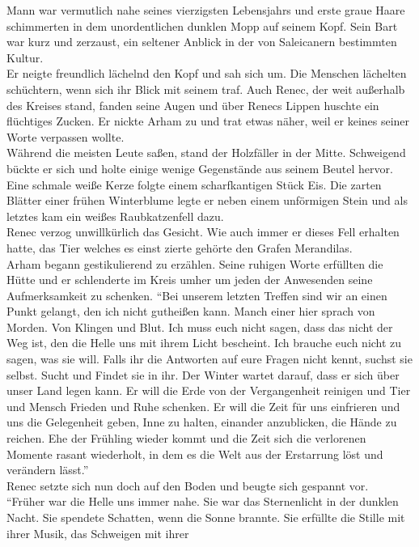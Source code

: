 Mann war vermutlich nahe seines vierzigsten Lebensjahrs und erste graue Haare schimmerten in dem 
unordentlichen dunklen Mopp auf seinem Kopf. Sein Bart war kurz und zerzaust, ein seltener Anblick 
in der von Saleicanern bestimmten Kultur.\\
Er neigte freundlich lächelnd den Kopf und sah sich um. Die Menschen lächelten schüchtern, wenn sich 
ihr Blick mit seinem traf. Auch Renec, der weit außerhalb des Kreises stand, fanden seine Augen und 
über Renecs Lippen huschte ein flüchtiges Zucken. Er nickte Arham zu und trat etwas näher, weil er 
keines seiner Worte verpassen wollte.\\
Während die meisten Leute saßen, stand der Holzfäller in der Mitte. Schweigend bückte er sich und 
holte einige wenige Gegenstände aus seinem Beutel hervor. Eine schmale weiße Kerze folgte einem 
scharfkantigen Stück Eis. Die zarten Blätter einer frühen Winterblume legte er neben einem 
unförmigen Stein und als letztes kam ein weißes Raubkatzenfell dazu.\\
Renec verzog unwillkürlich das Gesicht. Wie auch immer er dieses Fell erhalten hatte, das Tier 
welches es einst zierte gehörte den Grafen Merandilas.\\
Arham begann gestikulierend zu erzählen. Seine ruhigen Worte erfüllten die Hütte und er schlenderte 
im Kreis umher um jeden der Anwesenden seine Aufmerksamkeit zu schenken. ``Bei unserem letzten 
Treffen sind wir an einen Punkt gelangt, den ich nicht gutheißen kann. Manch einer hier sprach 
von Morden. Von Klingen und Blut. Ich muss euch nicht sagen, dass das nicht der Weg ist, den die 
Helle uns mit ihrem Licht bescheint. Ich brauche euch nicht zu sagen, was sie will. Falls ihr 
die Antworten auf eure Fragen nicht kennt, suchst sie selbst. Sucht und Findet sie in ihr. Der 
Winter wartet darauf, dass er sich über unser Land legen kann. Er will die Erde von der 
Vergangenheit reinigen und Tier und Mensch Frieden und Ruhe schenken. Er will die Zeit für uns 
einfrieren und uns die Gelegenheit geben, Inne zu halten, einander anzublicken, die Hände zu 
reichen. Ehe der Frühling wieder kommt und die Zeit sich die verlorenen Momente rasant wiederholt, 
in dem es die Welt aus der Erstarrung löst und verändern lässt.''\\
Renec setzte sich nun doch auf den Boden und beugte sich gespannt vor.\\
``Früher war die Helle uns immer nahe. Sie war das Sternenlicht in der dunklen Nacht. Sie spendete 
Schatten, wenn die Sonne brannte. Sie erfüllte die Stille mit ihrer Musik, das Schweigen mit ihrer 
